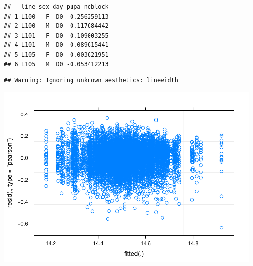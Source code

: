 \documentclass[
]{article}
\newenvironment{Shaded}{\begin{snugshade}}{\end{snugshade}}
\newcommand{\DataTypeTok}[1]{\textcolor[rgb]{0.13,0.29,0.53}{#1}}
\newcommand{\FloatTok}[1]{\textcolor[rgb]{0.00,0.00,0.81}{#1}}
\newcommand{\KeywordTok}[1]{\textcolor[rgb]{0.13,0.29,0.53}{\textbf{#1}}}
\newcommand{\NormalTok}[1]{#1}
\newcommand{\OperatorTok}[1]{\textcolor[rgb]{0.81,0.36,0.00}{\textbf{#1}}}
\newcommand{\StringTok}[1]{\textcolor[rgb]{0.31,0.60,0.02}{#1}}
\begin{document}
\begin{verbatim}
##   line sex day pupa_noblock
## 1 L100   F  D0  0.256259113
## 2 L100   M  D0  0.117684442
## 3 L101   F  D0  0.109003255
## 4 L101   M  D0  0.089615441
## 5 L105   F  D0 -0.003621951
## 6 L105   M  D0 -0.053412213
\end{verbatim}

\begin{Shaded}
\end{Shaded}

\begin{verbatim}
## Warning: Ignoring unknown aesthetics: linewidth
\end{verbatim}

\includegraphics{_PreliminaryAnalysis_files/figure-latex/unnamed-chunk-19-1.pdf}
\end{document}
